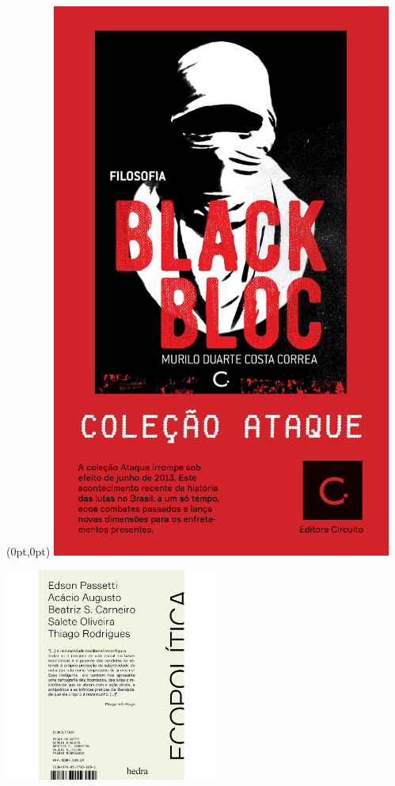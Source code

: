 \pagestyle{circuito}
\label{circuito}

\begin{textblock*}{5.625in}(0pt,0pt)%
\vspace*{-1.45cm}
\hspace*{-1.8cm}\includegraphics*[width=112mm]{./imgs/CIRCUITO.png}
\end{textblock*}

\pagebreak

\hspace{.5cm}

\begin{center}
\hspace*{-1cm}
\hspace{1cm}\includegraphics[width=70mm]{eco.jpeg}
\end{center}

